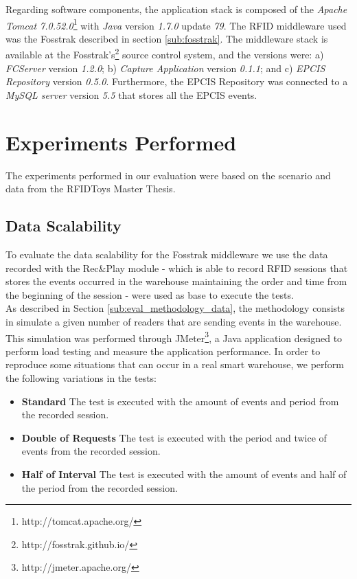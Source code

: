 Regarding software components, the application stack is composed of the \textit{Apache Tomcat 7.0.52.0}\footnote{http://tomcat.apache.org/}
with \textit{Java} version \textit{1.7.0} update \textit{79}. The \gls{RFID} middleware used was the Fosstrak
described in section \ref{sub:fosstrak}. The middleware stack is available at the Fosstrak's\footnote{http://fosstrak.github.io/}
source control system, and the versions were: a) \textit{FCServer} version \textit{1.2.0}; b) \textit{Capture Application}
version \textit{0.1.1}; and c) \textit{\gls{EPCIS} Repository} version \textit{0.5.0}. Furthermore,
the \gls{EPCIS} Repository was connected to a \textit{MySQL server} version \textit{5.5} that stores
all the \gls{EPCIS} events.

\section{Experiments Performed}
\label{sec:eval_experiments}
The experiments performed in our evaluation were based on the scenario and data from the RFIDToys\cite{Correia:Thesis:2014}
Master Thesis.

\subsection{Data Scalability}
\label{sub:eval_exp_data}
To evaluate the data scalability for the Fosstrak middleware we use the data recorded with the Rec\&Play
module - which is able to record \gls{RFID} sessions that stores the events occurred in the warehouse
maintaining the order and time from the beginning of the session - were used as base to execute
the tests.\\

As described in Section \ref{sub:eval_methodology_data}, the methodology consists in simulate a given
number of readers that are sending events in the warehouse. This simulation was performed through JMeter\footnote{http://jmeter.apache.org/},
a Java application designed to perform load testing and measure the application performance.
In order to reproduce some situations that can occur in a real smart warehouse, we perform the following
variations in the tests:

\begin{itemize}
  \item\textbf{Standard} The test is executed with the amount of events and period from the recorded session.
  \item\textbf{Double of Requests} The test is executed with the period and twice of events from the recorded
  session.
  \item\textbf{Half of Interval} The test is executed with the amount of events and half of the period from
  the recorded session.
\end{itemize}

